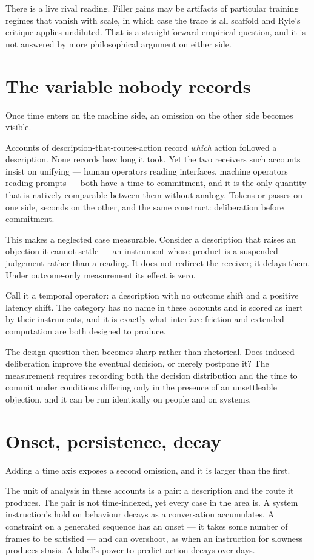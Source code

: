 \documentclass[11pt,a4paper]{article}
\begin{document}
There is a live rival reading. Filler gains may be artifacts of particular training regimes that vanish with scale, in which case the trace is all scaffold and Ryle's critique applies undiluted. That is a straightforward empirical question, and it is not answered by more philosophical argument on either side.

\section{The variable nobody records}
Once time enters on the machine side, an omission on the other side becomes visible.

Accounts of description-that-routes-action record \emph{which} action followed a description. None records how long it took. Yet the two receivers such accounts insist on unifying --- human operators reading interfaces, machine operators reading prompts --- both have a time to commitment, and it is the only quantity that is natively comparable between them without analogy. Tokens or passes on one side, seconds on the other, and the same construct: deliberation before commitment.

This makes a neglected case measurable. Consider a description that raises an objection it cannot settle --- an instrument whose product is a suspended judgement rather than a reading. It does not redirect the receiver; it delays them. Under outcome-only measurement its effect is zero.

Call it a temporal operator: a description with no outcome shift and a positive latency shift. The category has no name in these accounts and is scored as inert by their instruments, and it is exactly what interface friction and extended computation are both designed to produce.

The design question then becomes sharp rather than rhetorical. Does induced deliberation improve the eventual decision, or merely postpone it? The measurement requires recording both the decision distribution and the time to commit under conditions differing only in the presence of an unsettleable objection, and it can be run identically on people and on systems.

\section{Onset, persistence, decay}
Adding a time axis exposes a second omission, and it is larger than the first.

The unit of analysis in these accounts is a pair: a description and the route it produces. The pair is not time-indexed, yet every case in the area is. A system instruction's hold on behaviour decays as a conversation accumulates. A constraint on a generated sequence has an onset --- it takes some number of frames to be satisfied --- and can overshoot, as when an instruction for slowness produces stasis. A label's power to predict action decays over days.
\end{document}
